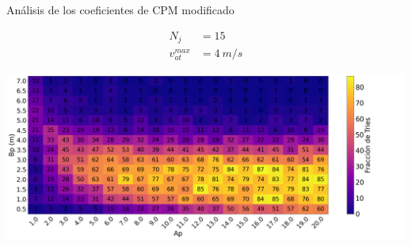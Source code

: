 \begin{frame}{Análisis de los coeficientes de CPM modificado}
    \begin{center}
        \begin{minipage}[c]{0.15\textwidth}
            \begin{equation*}
                \begin{aligned}
                    N_j &= 15 \\
                    v_{at}^{max} &= 4\ m/s
                \end{aligned}
            \end{equation*}
        \end{minipage}
        \hfill
        \begin{minipage}[c]{0.80\textwidth}
            \includegraphics[width=1.1\textwidth]{pic/05-resultados/r2}
        \end{minipage}
    \end{center}
    \vfill
    \footnotesize{}
\end{frame}

